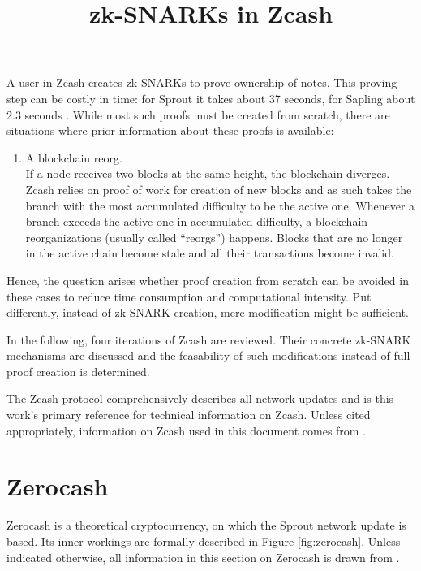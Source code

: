 \documentclass{article}
\title{zk-SNARKs in Zcash}
\date{}
\begin{document}
\maketitle

A user in Zcash creates zk-SNARKs to prove ownership of notes.
This proving step can be costly in time: for Sprout it takes about 37 seconds, for Sapling about 2.3 seconds \cite{electriccoin:provingtime}.
While most such proofs must be created from scratch, there are situations where prior information about these proofs is available:

\begin{enumerate}
        \item A blockchain reorg. \\
        If a node receives two blocks at the same height, the blockchain diverges.
        Zcash relies on proof of work for creation of new blocks and as such takes
        the branch with the most accumulated difficulty to be the active one.
        Whenever a branch exceeds the active one in accumulated difficulty, a blockchain reorganizations (usually called ``reorgs'') happens.
        Blocks that are no longer in the active chain become stale and all their transactions become invalid.
\end{enumerate}

Hence, the question arises whether proof creation from scratch can be avoided in these cases to reduce time consumption and computational intensity.
Put differently, instead of zk-SNARK creation, mere modification might be sufficient.

In the following, four iterations of Zcash are reviewed.
Their concrete zk-SNARK mechanisms are discussed and the feasability of such modifications instead of full proof creation is determined.

The Zcash protocol \cite{hopwood:zcash} comprehensively describes all network updates and is this work's primary reference for technical information on Zcash.
Unless cited appropriately, information on Zcash used in this document comes from \cite{hopwood:zcash}.

\section{Zerocash}

Zerocash \cite{bensasson:zerocash} is a theoretical cryptocurrency, on which the Sprout network update is based.
Its inner workings are formally described in Figure \ref{fig:zerocash}.
Unless indicated otherwise, all information in this section on Zerocash is drawn from \cite{bensasson:zerocash}.
\end{document}
